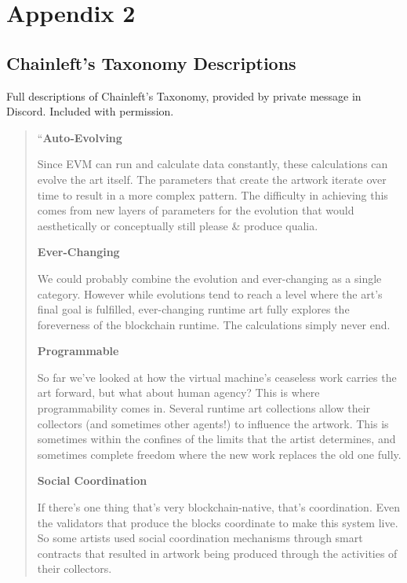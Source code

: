 \chapter*{Appendix 2}
\label{appx:chainleft-taxonomy}

\section*{Chainleft's Taxonomy Descriptions}




Full descriptions of Chainleft's Taxonomy, provided by private message in Discord. Included with permission.


\begin{quote}
``\textbf{Auto-Evolving}

Since EVM can run and calculate data constantly, these calculations can evolve the art itself. The parameters that create the artwork iterate over time to result in a more complex pattern. The difficulty in achieving this comes from new layers of parameters for the evolution that would aesthetically or conceptually still please \& produce qualia.

\textbf{Ever-Changing}

We could probably combine the evolution and ever-changing as a single category. However while evolutions tend to reach a level where the art’s final goal is fulfilled, ever-changing runtime art fully explores the foreverness of the blockchain runtime. The calculations simply never end.

\textbf{Programmable}

So far we’ve looked at how the virtual machine’s ceaseless work carries the art forward, but what about human agency? This is where programmability comes in. Several runtime art collections allow their collectors (and sometimes other agents!) to influence the artwork. This is sometimes within the confines of the limits that the artist determines, and sometimes complete freedom where the new work replaces the old one fully.

\textbf{Social Coordination}

If there’s one thing that’s very blockchain-native, that’s coordination. Even the validators that produce the blocks coordinate to make this system live. So some artists used social coordination mechanisms through smart contracts that resulted in artwork being produced through the activities of their collectors.


\end{quote}
